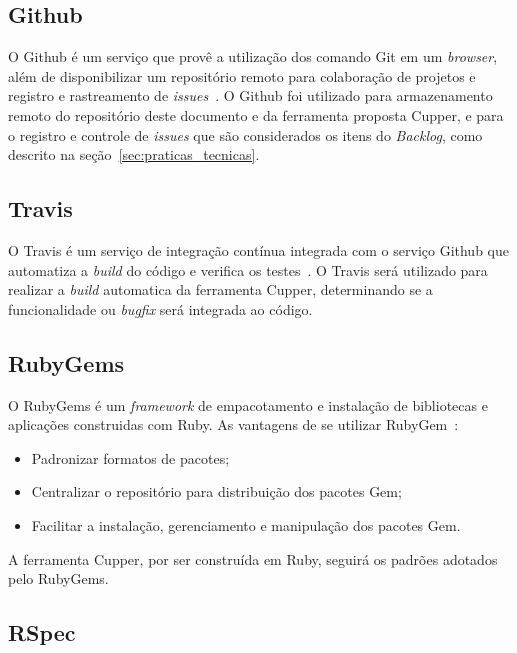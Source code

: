 \subsection{Github}
\label{sec:supdev:github}

O Github é um serviço que provê a utilização dos comando Git em um \textit{browser}, além de
disponibilizar um repositório remoto para colaboração de projetos e registro e rastreamento de
\textit{issues}~\cite{github:2016}.  O Github foi utilizado para armazenamento remoto do repositório
deste documento e da ferramenta proposta Cupper, e para o registro e controle de \textit{issues} que são
considerados os itens do \textit{Backlog}, como descrito na seção~\ref{sec:praticas_tecnicas}.

\subsection{Travis}
\label{sec:supdev:travis}

O Travis é um serviço de integração contínua integrada com o serviço Github que automatiza
a \textit{build} do código e verifica os testes~\cite{travis:2016}. O Travis será utilizado para
realizar a \textit{build} automatica da ferramenta Cupper, determinando se a funcionalidade ou \textit{bugfix}
será integrada ao código.

\subsection{RubyGems}
\label{sec:supdev:rubygems}

O RubyGems é um \textit{framework} de empacotamento e instalação de bibliotecas e aplicações
construidas com Ruby. As vantagens de se utilizar RubyGem~\cite{thomas:2001}:

\begin{itemize}
 \item Padronizar formatos de pacotes;
 \item Centralizar o repositório para distribuição dos pacotes Gem;
 \item Facilitar a instalação, gerenciamento e manipulação dos pacotes Gem.
\end{itemize}

A ferramenta Cupper, por ser construída em Ruby, seguirá os padrões adotados
pelo RubyGems.

\subsection{RSpec}
\label{sec:supdev:rspec}

